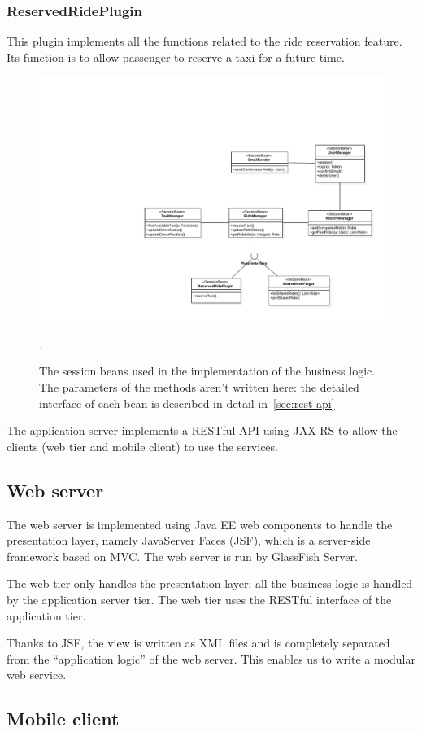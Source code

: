 \subsubsection{ReservedRidePlugin}
This plugin implements all the functions related to the ride reservation feature.
Its function is to allow passenger to reserve a taxi for a future time.


\begin{figure}
    \centering
    \includegraphics[width=\textwidth]{diagrams/class_sessionbeans}
    \caption{The session beans used in the implementation of the business logic. The parameters of the methods aren't written here: the detailed interface of each bean is described in detail in~\autoref{sec:rest-api}}.
    \label{fig:session-beans}
\end{figure}

The application server implements a RESTful API using JAX-RS to allow the clients (web tier and mobile client) to use the services.

\subsection{Web server}
The web server is implemented using Java EE web components to handle the presentation layer, namely JavaServer Faces (JSF), which is a server-side framework based on MVC.
The web server is run by GlassFish Server.

The web tier only handles the presentation layer: all the business logic is handled by the application server tier. The web tier uses the RESTful interface of the application tier.

Thanks to JSF, the view is written as XML files and is completely separated from the ``application logic'' of the web server. This enables us to write a modular web service.

\subsection{Mobile client}

